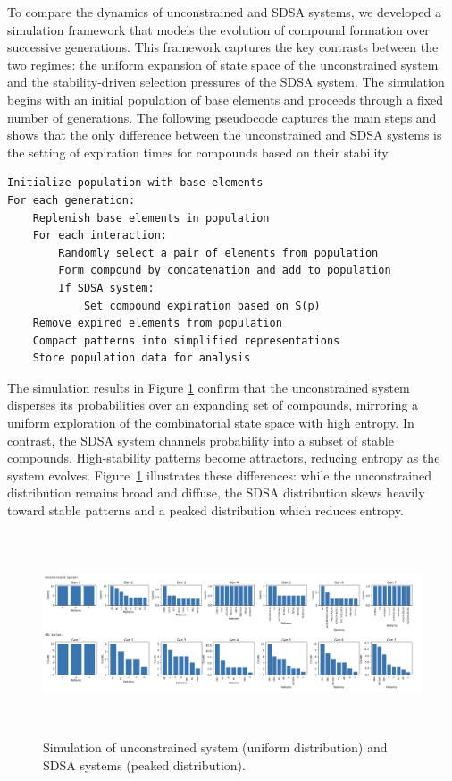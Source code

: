 \documentclass[preprint,12pt]{elsarticle}
\begin{document}
To compare the dynamics of unconstrained and SDSA systems, we developed a simulation framework that models the evolution of compound formation over successive generations. This framework captures the key contrasts between the two regimes: the uniform expansion of state space of the unconstrained system and the stability-driven selection pressures of the SDSA system. The simulation begins with an initial population of base elements and proceeds through a fixed number of generations. The following pseudocode captures the main steps and shows that the only difference between the unconstrained and SDSA systems is the setting of expiration times for compounds based on their stability.

\begin{center}
\begin{minipage}{0.9\textwidth}
\ttfamily
\begin{verbatim}
Initialize population with base elements
For each generation:
    Replenish base elements in population
    For each interaction:
        Randomly select a pair of elements from population
        Form compound by concatenation and add to population
        If SDSA system:
            Set compound expiration based on S(p)
    Remove expired elements from population
    Compact patterns into simplified representations
    Store population data for analysis
\end{verbatim}
\end{minipage}
\end{center}
The simulation results in Figure \ref{fig:figure_4} confirm that the unconstrained system disperses its probabilities over an expanding set of compounds, mirroring a uniform exploration of the combinatorial state space with high entropy. In contrast, the SDSA system channels probability into a subset of stable compounds. High-stability patterns become attractors, reducing entropy as the system evolves. Figure~\ref{fig:figure_4} illustrates these differences: while the unconstrained distribution remains broad and diffuse, the SDSA distribution skews heavily toward stable patterns and a peaked distribution which reduces entropy.

\begin{figure}[h]
    \centering
    \includegraphics[width=1\textwidth,height=6cm]{figure_4.png}
    \caption{Simulation of  unconstrained system (uniform distribution) and SDSA systems (peaked distribution).}
    \label{fig:figure_4}
 \end{figure}
\end{document}
